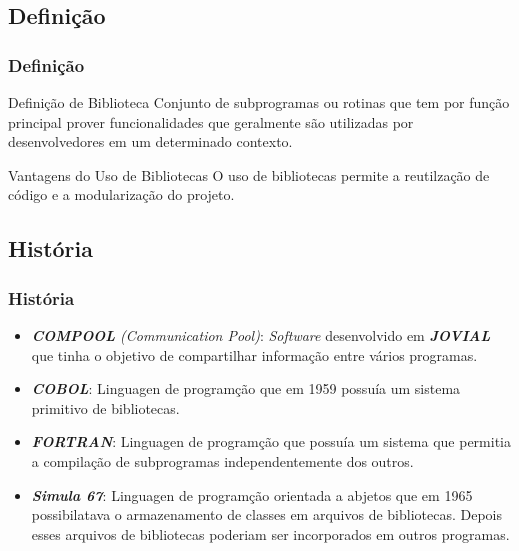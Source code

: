  \subsection{Definição}
 \begin{frame}
  \frametitle{Definição}
  
  \begin{block}{Definição de Biblioteca}
    Conjunto de subprogramas ou rotinas que tem por função principal prover funcionalidades que geralmente são 
    utilizadas por desenvolvedores em um determinado contexto.
  \end{block}
  
  \begin{block}{Vantagens do Uso de Bibliotecas}
    O uso de bibliotecas permite a reutilzação de código e a modularização do projeto.
  \end{block}
 \end{frame}

 
 \subsection{História}
\begin{frame}
 \frametitle{História}
 
  \begin{itemize}
  
   \item \emph{\textbf{COMPOOL} (Communication Pool)}: \emph{Software} desenvolvido em \emph{\textbf{JOVIAL}} 
   que tinha o objetivo de compartilhar informação entre vários programas.
   
   \item \emph{\textbf{COBOL}}: Linguagen de programção que em 1959 possuía um sistema primitivo de bibliotecas.
   
   \item \emph{\textbf{FORTRAN}}: Linguagen de programção que possuía um sistema que permitia a compilação de 
   subprogramas independentemente dos outros. 
   
   \item \emph{\textbf{Simula 67}}: Linguagen de programção orientada a abjetos que em 1965 possibilatava o 
   armazenamento de classes em arquivos de bibliotecas. Depois esses arquivos de bibliotecas poderiam ser 
   incorporados em outros programas.
   
  \end{itemize}

  
\end{frame}

